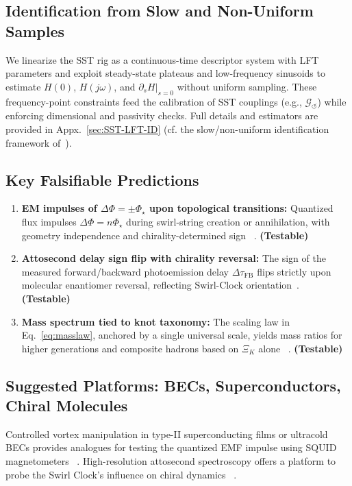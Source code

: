\documentclass[10pt,reprint,aps,onecolumn,nofootinbib]{revtex4-2}
\newcommand{\testable}{\textbf{(Testable)}}
\begin{document}
        \subsection{Identification from Slow and Non-Uniform Samples}
            \label{sec:methods-lft-id-brief}
            We linearize the SST rig as a continuous-time descriptor system with LFT parameters and exploit
            steady-state plateaus and low-frequency sinusoids to estimate $H(0)$, $H(j\omega)$, and $\partial_s H|_{s=0}$
            without uniform sampling. These frequency-point constraints feed the calibration of SST couplings
            (e.g., $\mathcal{G}_{\!\boldsymbol{\circlearrowleft}}$) while enforcing dimensional and passivity checks. Full details and estimators
            are provided in Appx.~\ref{sec:SST-LFT-ID} (cf. the slow/non-uniform identification framework of~\cite{Zhou2025LFTDescriptorID}).

        \subsection*{Key Falsifiable Predictions}
            \begin{enumerate}
                \item \textbf{EM impulses of $\Delta\Phi = \pm \Phi_\star$ upon topological transitions:} Quantized flux impulses $\Delta\Phi=n\Phi_\star$ during swirl-string creation or annihilation, with geometry independence and chirality-determined sign~ \cite{EM_G}. \testable
                \item \textbf{Attosecond delay sign flip with chirality reversal:} The sign of the measured forward/backward photoemission delay $\Delta\tau_\text{FB}$ flips strictly upon molecular enantiomer reversal, reflecting Swirl-Clock orientation~\cite{sstAttosecondPhotoionization,Nahon2020}. \testable
                \item \textbf{Mass spectrum tied to knot taxonomy:} The scaling law in Eq.~\ref{eq:masslaw}, anchored by a single universal scale, yields mass ratios for higher generations and composite hadrons based on $\Xi_K$ alone~ \cite{sstLagrangian}. \testable
            \end{enumerate}

        \subsection*{Suggested Platforms: BECs, Superconductors, Chiral Molecules}
            Controlled vortex manipulation in type-II superconducting films or ultracold BECs provides analogues for testing the quantized EMF impulse using SQUID magnetometers~ \cite{EM_G}. High-resolution attosecond spectroscopy offers a platform to probe the Swirl Clock’s influence on chiral dynamics~ \cite{sstAttosecondPhotoionization}.
\end{document}
